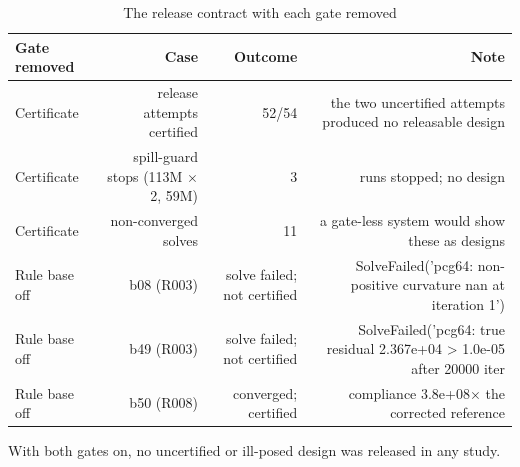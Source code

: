 \begin{table}[t]
\centering\small
\caption{The release contract with each gate removed}
\label{tab:t12_gates}
\begin{tabular}{lrrr}
\toprule
Gate removed & Case & Outcome & Note \\
\midrule
Certificate & release attempts certified & 52/54 & the two uncertified attempts produced no releasable design \\
Certificate & spill-guard stops (113M $\times$2, 59M) & 3 & runs stopped; no design \\
Certificate & non-converged solves & 11 & a gate-less system would show these as designs \\
Rule base off & b08 (R003) & solve failed; not certified & SolveFailed('pcg64: non-positive curvature nan at iteration 1') \\
Rule base off & b49 (R003) & solve failed; not certified & SolveFailed('pcg64: true residual 2.367e+04 > 1.0e-05 after 20000 iter \\
Rule base off & b50 (R008) & converged; certified & compliance 3.8e+08$\times$ the corrected reference \\
\bottomrule
\end{tabular}
\par\smallskip\footnotesize With both gates on, no uncertified or ill-posed design was released in any study.
\end{table}

